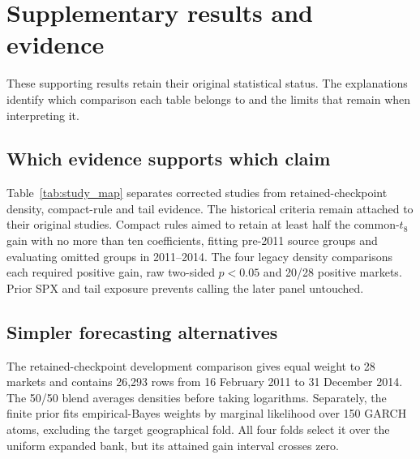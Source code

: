 \chapter{Supplementary results and evidence}
\label{app:results}\label{app:protocols}\label{app:evidence}\label{app:alternative-checks}\label{app:tail-support}\label{app:analysis-support}

These supporting results retain their original statistical status. The explanations identify which comparison each table belongs to and the limits that remain when interpreting it.

\section{Which evidence supports which claim}

Table~\ref{tab:study_map} separates corrected studies from retained-checkpoint density, compact-rule and tail evidence. The historical criteria remain attached to their original studies. Compact rules aimed to retain at least half the common-$t_8$ gain with no more than ten coefficients, fitting pre-2011 source groups and evaluating omitted groups in 2011--2014. The four legacy density comparisons each required positive gain, raw two-sided $p<0.05$ and 20/28 positive markets. Prior SPX and tail exposure prevents calling the later panel untouched.

\section{Simpler forecasting alternatives}

The retained-checkpoint development comparison gives equal weight to 28 markets and contains 26,293 rows from 16 February 2011 to 31 December 2014. The 50/50 blend averages densities before taking logarithms. Separately, the finite prior fits empirical-Bayes weights by marginal likelihood over 150 GARCH atoms, excluding the target geographical fold. All four folds select it over the uniform expanded bank, but its attained gain interval crosses zero.

